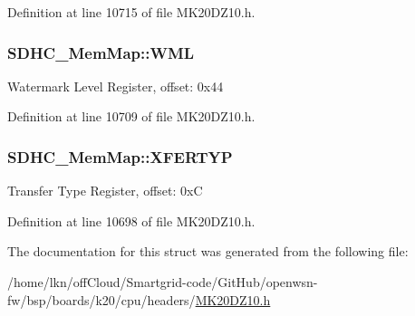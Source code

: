 Definition at line 10715 of file M\+K20\+D\+Z10.\+h.

\subsubsection[{\texorpdfstring{W\+ML}{WML}}]{ S\+D\+H\+C\+\_\+\+Mem\+Map\+::\+W\+ML}\hypertarget{struct_s_d_h_c___mem_map_a8c1eb45065f5eb8878fc02701f2a6750}{}\label{struct_s_d_h_c___mem_map_a8c1eb45065f5eb8878fc02701f2a6750}
Watermark Level Register, offset\+: 0x44 

Definition at line 10709 of file M\+K20\+D\+Z10.\+h.

\subsubsection[{\texorpdfstring{X\+F\+E\+R\+T\+YP}{XFERTYP}}]{ S\+D\+H\+C\+\_\+\+Mem\+Map\+::\+X\+F\+E\+R\+T\+YP}\hypertarget{struct_s_d_h_c___mem_map_ad6c008e044af83f7411e51258f111c48}{}\label{struct_s_d_h_c___mem_map_ad6c008e044af83f7411e51258f111c48}
Transfer Type Register, offset\+: 0xC 

Definition at line 10698 of file M\+K20\+D\+Z10.\+h.



The documentation for this struct was generated from the following file\+:\begin{DoxyCompactItemize}
\item 
/home/lkn/off\+Cloud/\+Smartgrid-\/code/\+Git\+Hub/openwsn-\/fw/bsp/boards/k20/cpu/headers/\hyperlink{_m_k20_d_z10_8h}{M\+K20\+D\+Z10.\+h}\end{DoxyCompactItemize}
